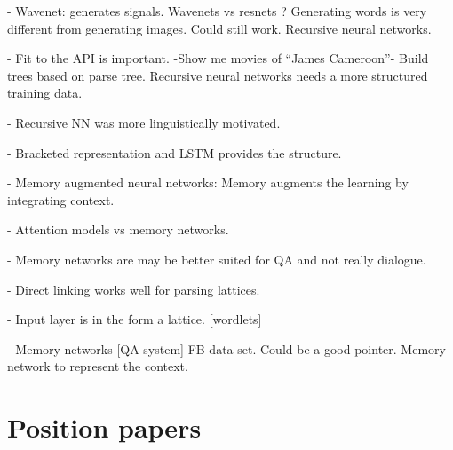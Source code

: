 \documentclass[12pt]{article}
\begin{document}
- Wavenet: generates signals. Wavenets vs resnets ? Generating words is very different from generating images. Could still work. Recursive neural networks.

- Fit to the API is important. -Show me movies of “James Cameroon”- Build trees based on parse tree. Recursive neural networks needs a more structured training data.

- Recursive NN was more linguistically motivated.

- Bracketed representation and LSTM provides the structure.

- Memory augmented neural networks: Memory augments the learning by integrating context.

- Attention models vs memory networks.

- Memory networks are may be better suited for QA and not really dialogue.

- Direct linking works well for parsing lattices.

- Input layer is in the form a lattice. [wordlets]

- Memory networks [QA system] FB data set. Could be a good pointer. Memory network to represent the context.


\section{Position papers}
\end{document}
